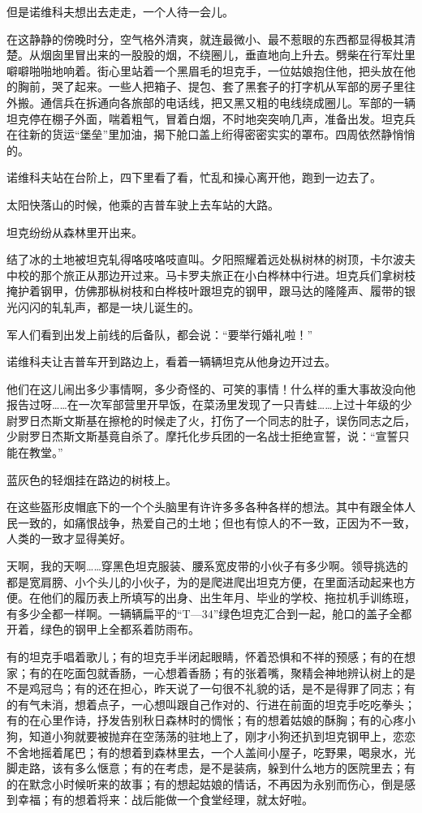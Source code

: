 但是诺维科夫想出去走走，一个人待一会儿。

在这静静的傍晚时分，空气格外清爽，就连最微小、最不惹眼的东西都显得极其清楚。从烟囱里冒出来的一股股的烟，不绕圈儿，垂直地向上升去。劈柴在行军灶里噼噼啪啪地响着。街心里站着一个黑眉毛的坦克手，一位姑娘抱住他，把头放在他的胸前，哭了起来。一些人把箱子、提包、套了黑套子的打字机从军部的房子里往外搬。通信兵在拆通向各旅部的电话线，把又黑又粗的电线绕成圈儿。军部的一辆坦克停在棚子外面，喘着粗气，冒着白烟，不时地突突响几声，准备出发。坦克兵在往新的货运“堡垒”里加油，揭下舱口盖上绗得密密实实的罩布。四周依然静悄悄的。

诺维科夫站在台阶上，四下里看了看，忙乱和操心离开他，跑到一边去了。

太阳快落山的时候，他乘的吉普车驶上去车站的大路。

坦克纷纷从森林里开出来。

结了冰的土地被坦克轧得咯吱咯吱直叫。夕阳照耀着远处枞树林的树顶，卡尔波夫中校的那个旅正从那边开过来。马卡罗夫旅正在小白桦林中行进。坦克兵们拿树枝掩护着钢甲，仿佛那枞树枝和白桦枝叶跟坦克的钢甲，跟马达的隆隆声、履带的银光闪闪的轧轧声，都是一块儿诞生的。

军人们看到出发上前线的后备队，都会说：“要举行婚礼啦！”

诺维科夫让吉普车开到路边上，看着一辆辆坦克从他身边开过去。

他们在这儿闹出多少事情啊，多少奇怪的、可笑的事情！什么样的重大事故没向他报告过呀……在一次军部营里开早饭，在菜汤里发现了一只青蛙……上过十年级的少尉罗日杰斯文斯基在擦枪的时候走了火，打伤了一个同志的肚子，误伤同志之后，少尉罗日杰斯文斯基竟自杀了。摩托化步兵团的一名战士拒绝宣誓，说：“宣誓只能在教堂。”

蓝灰色的轻烟挂在路边的树枝上。

在这些盔形皮帽底下的一个个头脑里有许许多多各种各样的想法。其中有跟全体人民一致的，如痛恨战争，热爱自己的土地；但也有惊人的不一致，正因为不一致，人类的一致才显得美好。

天啊，我的天啊……穿黑色坦克服装、腰系宽皮带的小伙子有多少啊。领导挑选的都是宽肩膀、小个头儿的小伙子，为的是爬进爬出坦克方便，在里面活动起来也方便。在他们的履历表上所填写的出身、出生年月、毕业的学校、拖拉机手训练班，有多少全都一样啊。一辆辆扁平的“T—34”绿色坦克汇合到一起，舱口的盖子全都开着，绿色的钢甲上全都系着防雨布。

有的坦克手唱着歌儿；有的坦克手半闭起眼睛，怀着恐惧和不祥的预感；有的在想家；有的在吃面包就香肠，一心想着香肠；有的张着嘴，聚精会神地辨认树上的是不是鸡冠鸟；有的还在担心，昨天说了一句很不礼貌的话，是不是得罪了同志；有的有气未消，想着点子，一心想叫跟自己作对的、行进在前面的坦克手吃吃拳头；有的在心里作诗，抒发告别秋日森林时的惆怅；有的想着姑娘的酥胸；有的心疼小狗，知道小狗就要被抛弃在空荡荡的驻地上了，刚才小狗还扒到坦克钢甲上，恋恋不舍地摇着尾巴；有的想着到森林里去，一个人盖间小屋子，吃野果，喝泉水，光脚走路，该有多么惬意；有的在考虑，是不是装病，躲到什么地方的医院里去；有的在默念小时候听来的故事；有的想起姑娘的情话，不再因为永别而伤心，倒是感到幸福；有的想着将来：战后能做一个食堂经理，就太好啦。

